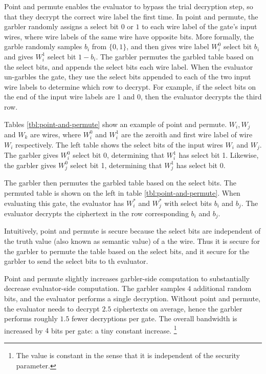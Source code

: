 Point and permute enables the evaluator to bypass the trial decryption step, so that they decrypt the correct wire label the first time.
In point and permute, the garbler randomly assigns a select bit $0$ or $1$ to each wire label of the gate's input wires, where wire labels of the same wire have opposite bits.
More formally, the garble randomly samples $b_i$ from $\{0,1\}$, and then gives wire label $W_i^0$ select bit $b_i$ and gives $W_i^1$ select bit $1-b_i$.
The garbler permutes the garbled table based on the select bits, and appends the select bits each wire label.
When the evaluator un-garbles the gate, they use the select bits appended to each of the two input wire labels to determine which row to decrypt.
For example, if the select bits on the end of the input wire labels are 1 and 0, then the evaluator decrypts the third row.

Tables \ref{tbl:point-and-permute} show an example of point and permute.
$W_i, W_j$ and $W_k$ are wires, where $W_i^0$ and $W_i^1$ are the zeroith and first wire label of wire $W_i$ respectively.
The left table shows the select bits of the input wires $W_i$ and $W_j$.
The garbler gives $W_i^0$ select bit 0, determining that $W_i^1$ has select bit 1.
Likewise, the garbler gives $W_j^0$ select bit 1, determining that $W_j^1$ has select bit 0.

The garbler then permutes the garbled table based on the select bits. 
The permuted table is shown on the left in table \ref{tbl:point-and-permute}.
When evaluating this gate, the evaluator has $W_i^*$ and $W_j^*$ with select bits $b_i$ and $b_j$.
The evaluator decrypts the ciphertext in the row corresponding $b_i$ and $b_j$.

Intuitively, point and permute is secure because the select bits are independent of the truth value (also known as semantic value) of a the wire.
Thus it is secure for the garbler to permute the table based on the select bits, and it secure for the garbler to send the select bits to th evaluator.

Point and permute slightly increases garbler-side computation to substantially decrease evaluator-side computation.
The garbler samples $4$ additional random bits, and the evaluator performs a single decryption.
Without point and permute, the evaluator needs to decrypt $2.5$ ciphertexts on average, hence the garbler performs roughly $1.5$ fewer decryptions per gate.
The overall bandwidth is increased by $4$ bits per gate: a tiny constant increase. \footnote{The value is constant in the sense that it is independent of the security parameter.}

